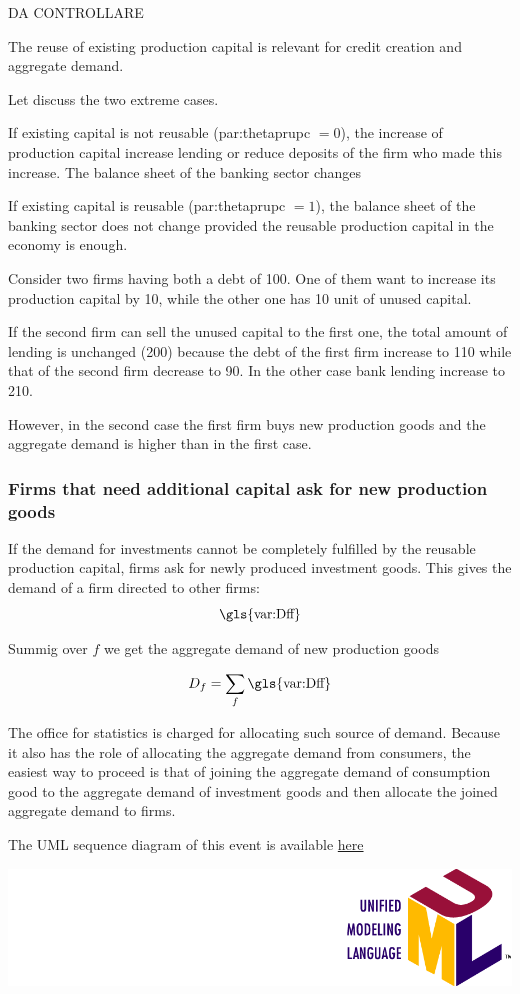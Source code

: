 \documentclass{book}
\newcommand{\doclocation}{file:///Users/giulioni/Documents/workspace/gabriele/docs}
\begin{document}
DA CONTROLLARE

The reuse of existing production capital is relevant for credit creation and aggregate demand.

Let discuss the two extreme cases.

If existing capital is not reusable (\gls{par:thetaprupc} $=0$), the increase of production capital increase lending or reduce deposits of the firm who made this increase. The balance sheet of the banking sector changes

If existing capital is reusable (\gls{par:thetaprupc} $=1$), the balance sheet of the banking sector does not change provided the reusable production capital in the economy is enough.

Consider two firms having both a debt of 100. One of them want to increase its production capital by 10, while the other one has 10 unit of unused capital. 

If the second firm can sell the unused capital to the first one, the total amount of lending is unchanged (200) because the debt of the first firm increase to 110 while that of the second firm decrease to 90.
In the other case bank lending increase to 210.

However, in the second case the first firm buys new production goods and the aggregate demand is higher than in the first case. 

\fi

\subsubsection{Firms that need additional capital ask for new production goods}

If the demand for investments cannot be completely fulfilled by the reusable production capital, firms ask for newly produced investment goods. This gives the demand of a firm directed to other firms:
\[\textnormal{\gls{var:Dff}}\]

Summig over $f$ we get the aggregate demand of new production goods

\[D_f=\sum_f \textnormal{\gls{var:Dff}}\]

The office for statistics is charged for allocating such source of demand. Because it also has the role of allocating the aggregate demand from consumers, the easiest way to proceed is that of joining the aggregate demand of consumption good to the aggregate demand of investment goods and then allocate the joined aggregate demand to firms.

\vskip3mm
The UML sequence diagram of this event is available \href{\doclocation/umldoc/allocateInvestments.html}{here}
\begin{marginfigure}
	\includegraphics[scale=0.1]{uml.png}
\end{marginfigure}
\end{document}
